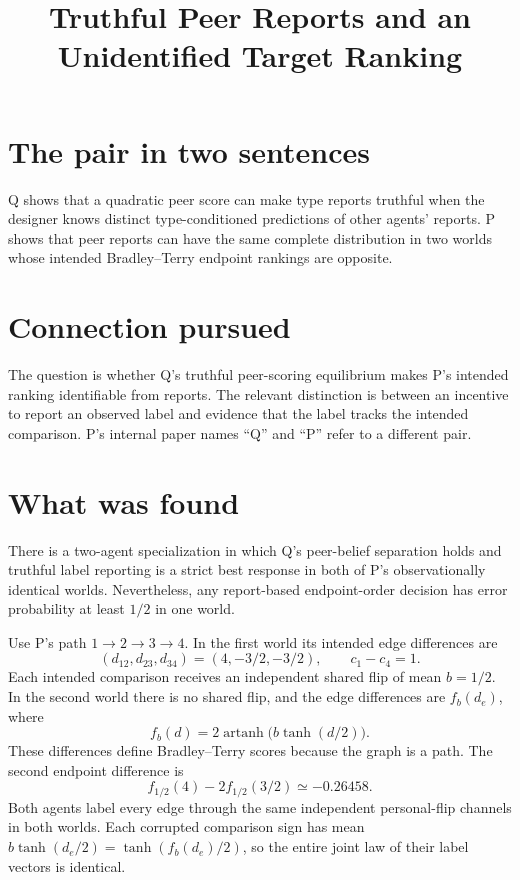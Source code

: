 \documentclass{article}
\title{Truthful Peer Reports and an Unidentified Target Ranking}
\begin{document}
\maketitle

\section{The pair in two sentences}

Q shows that a quadratic peer score can make type reports truthful when the designer knows distinct type-conditioned predictions of other agents' reports. P shows that peer reports can have the same complete distribution in two worlds whose intended Bradley--Terry endpoint rankings are opposite. 

\section{Connection pursued}

The question is whether Q's truthful peer-scoring equilibrium makes P's intended ranking identifiable from reports. The relevant distinction is between an incentive to report an observed label and evidence that the label tracks the intended comparison. P's internal paper names ``Q'' and ``P'' refer to a different pair. 

\section{What was found}

\begin{claim}
There is a two-agent specialization in which Q's peer-belief separation holds and truthful label reporting is a strict best response in both of P's observationally identical worlds. Nevertheless, any report-based endpoint-order decision has error probability at least \(1/2\) in one world.
\end{claim}

Use P's path \(1\to2\to3\to4\). In the first world its intended edge differences are
\[
(d_{12},d_{23},d_{34})=(4,-3/2,-3/2),
\qquad c_1-c_4=1.
\]
Each intended comparison receives an independent shared flip of mean \(b=1/2\).
In the second world there is no shared flip, and the edge differences are
\(f_b(d_e)\), where
\[
f_b(d)=2\operatorname{artanh}\!\bigl(b\tanh(d/2)\bigr).
\]
These differences define Bradley--Terry scores because the graph is a path.
The second endpoint difference is
\[
f_{1/2}(4)-2f_{1/2}(3/2)\simeq-0.26458.
\]
Both agents label every edge through the same independent personal-flip
channels in both worlds. Each corrupted comparison sign has mean
\(b\tanh(d_e/2)=\tanh(f_b(d_e)/2)\), so the entire joint law of their label
vectors is identical. 
\end{document}
